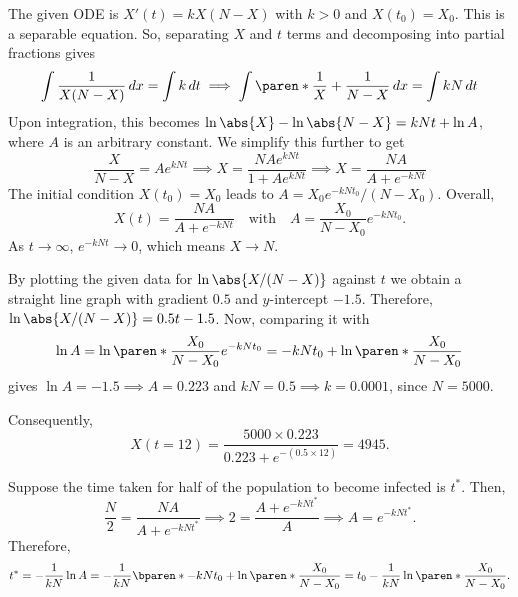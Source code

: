 \documentclass[11pt]{penrose}
\begin{document}
\clearpage
\begin{problem}{4}
    The given ODE is $X'(t) = k X (N - X)$ with $k > 0$ and $X(t_{0}) = X_{0}$. This is a separable equation. So, separating $X$ and $t$ terms and decomposing into partial fractions gives
    \begin{equation*}
        \int \frac{1}{X (N-X)} \,dx = \int k \,dt
        \implies \int \paren*{\frac{1}{X} + \frac{1}{N-X}} \,dx = \int kN \,dt
    \end{equation*}
    Upon integration, this becomes $\ln{\abs{X}} - \ln\abs{N-X} = kNt + \ln A$, where $A$ is an arbitrary constant. We simplify this further to get
    \begin{equation*}
        \frac{X}{N-X} = A e^{kNt}
        \implies
        X = \frac{N A e^{kNt}}{1 + A e^{kNt}}
        \implies
        X = \frac{N A}{A + e^{-kNt}}
    \end{equation*}
    The initial condition $X(t_{0}) = X_{0}$ leads to $A = X_{0} e^{-kNt_{0}} / (N - X_{0})$. Overall,
    \begin{equation*}
        X(t) = \frac{N A}{A + e^{-kNt}}
        \quad\text{with}\quad
        A = \frac{X_{0}}{N - X_{0}} e^{-kNt_{0}}.
    \end{equation*}
    As $t \to \infty$, $e^{-kNt} \to 0$, which means $X \to N$.

    By plotting the given data for $\ln\abs{X/(N-X)}$ against $t$ we obtain a straight line graph with gradient $0.5$ and $y$-intercept $-1.5$. Therefore, $\ln\abs{X/(N-X)} = 0.5 t - 1.5$. Now, comparing it with
    \begin{equation*}
        \ln A
        = \ln \paren*{ \frac{X_{0}}{N - X_{0}} e^{-kNt_{0}} }
        = -kNt_{0} + \ln \paren*{ \frac{X_{0}}{N - X_{0}} }
    \end{equation*}
    gives $\ln A = -1.5 \implies A = 0.223$ and $kN = 0.5 \implies k = 0.0001$, since $N = 5000$.

    Consequently,
    \begin{equation*}
        X(t = 12)
        = \frac{5000 \times 0.223}{0.223 + e^{-(0.5 \times 12)}}
        = 4945.
    \end{equation*}

    Suppose the time taken for half of the population to become infected is $t^{*}$. Then,
    \begin{equation*}
        \frac{N}{2} = \frac{N A}{A + e^{-kNt^{*}}}
        \implies
        2 = \frac{A + e^{-kNt^{*}}}{A}
        \implies
        A = e^{-kNt^{*}}.
    \end{equation*}
    Therefore,
    \begin{equation*}
        t^{*}
        = - \frac{1}{kN} \ln A
        = - \frac{1}{kN} \bparen*{ -kNt_{0} + \ln \paren*{ \frac{X_{0}}{N - X_{0}} } }
        = t_{0} - \frac{1}{kN} \ln \paren*{ \frac{X_{0}}{N - X_{0}} }.
    \end{equation*}
\end{problem}
\end{document}
